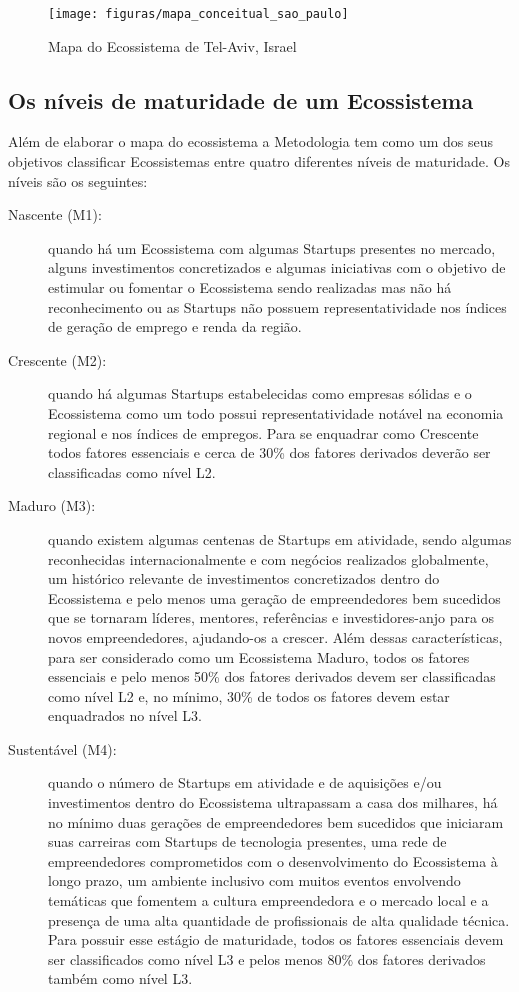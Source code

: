 \begin{figure}[!htbp]
\centering
\texttt{[image: figuras/mapa\_conceitual\_sao\_paulo]}
\caption{Mapa do Ecossistema de Tel-Aviv, Israel}
\label{Rotulo}
\end{figure}

\subsection{Os níveis de maturidade de um Ecossistema}
\label{subsection:niveis_de_maturidade_de_um_ecossistema}

Além de elaborar o mapa do ecossistema a Metodologia tem como um dos seus objetivos classificar Ecossistemas entre quatro diferentes níveis de maturidade. Os níveis são os seguintes:

\begin{description}
  \item [Nascente (M1):] quando há um Ecossistema com algumas Startups presentes no mercado, alguns investimentos concretizados e algumas iniciativas com o objetivo de estimular ou fomentar o Ecossistema sendo realizadas mas não há reconhecimento ou as Startups não possuem representatividade nos índices de geração de emprego e renda da região.

  \item [Crescente (M2):] quando há algumas Startups estabelecidas como empresas sólidas e o Ecossistema como um todo possui representatividade notável na economia regional e nos índices de empregos. Para se enquadrar como Crescente todos fatores essenciais e cerca de 30\% dos fatores derivados deverão ser classificadas como nível L2.

  \item [Maduro (M3):] quando existem algumas centenas de Startups em atividade, sendo algumas reconhecidas internacionalmente e com negócios realizados globalmente, um histórico relevante de investimentos concretizados dentro do Ecossistema e pelo menos uma geração de empreendedores bem sucedidos que se tornaram líderes, mentores, referências e investidores-anjo para os novos empreendedores, ajudando-os a crescer. Além dessas características, para ser considerado como um Ecossistema Maduro, todos os fatores essenciais e pelo menos 50\% dos fatores derivados devem ser classificadas como nível L2 e, no mínimo, 30\% de todos os fatores devem estar enquadrados no nível L3.

  \item [Sustentável (M4):] quando o número de Startups em atividade e de aquisições e/ou investimentos dentro do Ecossistema ultrapassam a casa dos milhares, há no mínimo duas gerações de empreendedores bem sucedidos que iniciaram suas carreiras com Startups de tecnologia presentes, uma rede de empreendedores comprometidos com o desenvolvimento do Ecossistema à longo prazo, um ambiente inclusivo com muitos eventos envolvendo temáticas que fomentem a cultura empreendedora e o mercado local e a presença de uma alta quantidade de profissionais de alta qualidade técnica. Para possuir esse estágio de maturidade, todos os fatores essenciais devem ser classificados como nível L3 e pelos menos 80\% dos fatores derivados também como nível L3.
\end{description}

